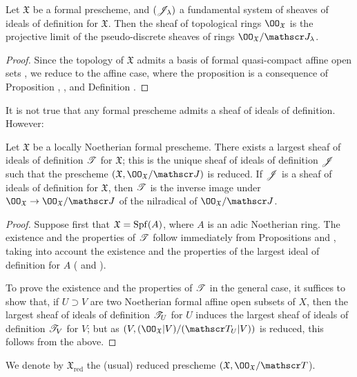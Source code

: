 \begin{prop}[10.5.3]
\label{1.10.5.3}
Let $\mathfrak{X}$ be a formal prescheme, and $(\mathscr{J}_\lambda)$ a fundamental system of sheaves of ideals of definition for $\mathfrak{X}$.
Then the sheaf of topological rings $\OO_\mathfrak{X}$ is the projective limit of the pseudo-discrete sheaves of rings  $\OO_\mathfrak{X}/\sh{J}_\lambda$.
\end{prop}

\begin{proof}
\label{proof-1.10.5.3}
Since the topology of $\mathfrak{X}$ admits a basis of formal quasi-compact affine open sets , we reduce to the affine case, where the proposition is a consequence of Proposition , , and Definition .
\end{proof}

It is not true that any formal prescheme admits a sheaf of ideals of definition.
However:
\begin{prop}[10.5.4]
\label{1.10.5.4}
Let $\mathfrak{X}$ be a locally Noetherian formal prescheme.
There exists a largest sheaf of ideals of definition $\mathscr{T}$ for $\mathfrak{X}$; this is the unique sheaf of ideals of definition $\mathscr{J}$ such that the prescheme $(\mathfrak{X},\OO_\mathfrak{X}/\sh{J})$ is reduced.
If $\mathscr{J}$ is a sheaf of ideals of definition for $\mathfrak{X}$, then $\mathscr{T}$ is the inverse image under $\OO_\mathfrak{X}\to\OO_\mathfrak{X}/\sh{J}$ of the nilradical of $\OO_\mathfrak{X}/\sh{J}$.
\end{prop}

\begin{proof}
\label{proof-1.10.5.4}
Suppose first that $\mathfrak{X}=\operatorname{Spf}(A)$, where $A$ is an adic Noetherian ring.
The existence and the properties of $\mathscr{T}$ follow immediately from Propositions  and , taking into account the existence and the properties of the largest ideal of definition for $A$ ( and ).

To prove the existence and the properties of $\mathscr{T}$ in the general case, it suffices to show that, if $U\supset V$ are two Noetherian formal affine open subsets of $X$, then the largest sheaf of ideals of definition $\mathscr{T}_U$ for $U$ induces the largest sheaf of ideals of definition $\mathscr{T}_V$ for $V$; but as $(V,(\OO_\mathfrak{X}|V)/(\sh{T}_U|V))$ is reduced, this follows from the above.
\end{proof}

We denote by $\mathfrak{X}_\text{red}$ the (usual) reduced prescheme $(\mathfrak{X},\OO_\mathfrak{X}/\sh{T}$).

